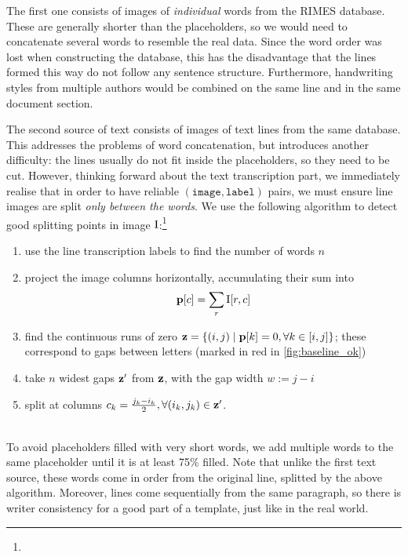 			The first one consists of images of \emph{individual} words from the RIMES database. These are generally shorter than the placeholders, so we would need to concatenate several words to resemble the real data. Since the word order was lost when constructing the database, this has the disadvantage that the lines formed this way do not follow any sentence structure. Furthermore, handwriting styles from multiple authors would be combined on the same line and in the same document section.

			The second source of text consists of images of text lines from the same database. This addresses the problems of word concatenation, but introduces another difficulty: the lines usually do not fit inside the placeholders, so they need to be cut. However, thinking forward about the text transcription part, we immediately realise that in order to have reliable \((\mathtt{image}, \mathtt{label})\) pairs, we must ensure line images are split \emph{only between the words}. We use the following algorithm to detect good splitting points in image \(\mathrm{I}\):\footnote{} %
			\noindent\begin{minipage}{\linewidth}
			\begin{enumerate}
				\item use the line transcription labels to find the number of words \(n\)
				\item project the image columns horizontally, accumulating their sum into \[
					\mathbf{p}[c] = \sum_r \mathrm{I}[r,c]
				\]
				\item find the continuous runs of zero \(\mathbf{z} = \{ (i, j) \mid \mathbf{p}[k] = 0, \forall k \in [i, j] \}\); these correspond to gaps between letters (marked in red in \autoref{fig:baseline_ok})
				\item take \(n\) widest gaps \(\mathbf{z}'\) from \(\mathbf{z}\), with the gap width \(w := j - i\)
				\item split at columns \(c_k = \frac{j_k - i_k}{2}, \forall (i_k, j_k) \in \mathbf{z}'\).
			\end{enumerate}
			\end{minipage}
			\\

			To avoid placeholders filled with very short words, we add multiple words to the same placeholder until it is at least 75\% filled. Note that unlike the first text source, these words come in order from the original line, splitted by the above algorithm. Moreover, lines come sequentially from the same paragraph, so there is writer consistency for a good part of a template, just like in the real world.

